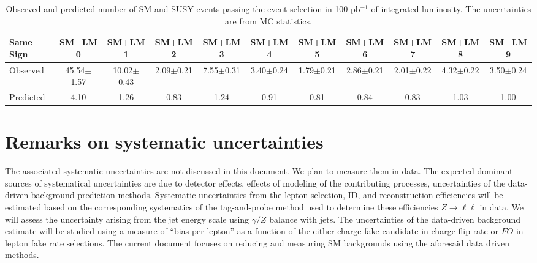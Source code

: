 \vspace{0.9mm}
\begin{table}[hbt]
\begin{center}
\renewcommand{\arraystretch}{1.2}
{\footnotesize\addtolength{\tabcolsep}{-4pt} 
\begin{tabular}{|l|c|c|c|c|c|c|c|c|c|c|}\hline
Same Sign & SM+LM0 & SM+LM1 & SM+LM2 & SM+LM3 & SM+LM4 & SM+LM5 & SM+LM6 & SM+LM7 & SM+LM8 & SM+LM9 \\ \hline
Observed & 45.54$\pm$1.57 & 10.02$\pm$0.43 & 2.09$\pm$0.21 & 7.55$\pm$0.31 & 3.40$\pm$0.24 & 1.79$\pm$0.21 & 2.86$\pm$0.21 & 2.01$\pm$0.22 & 4.32$\pm$0.22 & 3.50$\pm$0.24 \\ \hline
Predicted & 4.10 & 1.26 & 0.83 & 1.24 &	0.91 &	0.81 &	0.84 &	0.83 &	1.03 &	1.00 \\ \hline
\end{tabular} }
\caption{Observed and predicted  number of SM and SUSY events passing the event selection in 100 pb$^{-1}$ of integrated
luminosity. The uncertainties are from MC statistics.\label{tab:yieldsSUSY}}
\end{center}
\end{table}

\section{Remarks on systematic uncertainties}
\label{sec:systematics}
The associated systematic uncertainties are not discussed in this document. We plan to measure
them in data. The expected dominant sources of systematical uncertainties 
are due to detector effects, effects 
of modeling of the contributing processes, uncertainties of the data-driven background 
prediction methods.  Systematic uncertainties from the lepton selection, ID, and reconstruction efficiencies will be
estimated based on the corresponding systematics of the tag-and-probe method used to determine these efficiencies 
$Z \rightarrow \ell \ell$ in data. We will assess the uncertainty arising from the jet energy scale
using $\gamma/Z$ balance with jets. The uncertainties of the data-driven background estimate will be studied using 
a measure of ``bias per lepton'' as a function of the either charge fake candidate in charge-flip rate or $FO$ in
lepton fake rate selections. The current document focuses on reducing and measuring SM backgrounds using the aforesaid
data driven methods.

\clearpage

